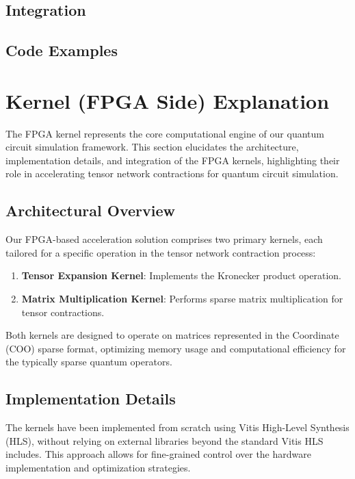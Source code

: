 \documentclass[12pt,oneside,a4paper]{article}
\begin{document}
\subsection{Integration}

\subsection{Code Examples}

\section{Kernel (FPGA Side) Explanation}

The FPGA kernel represents the core computational engine of our quantum circuit simulation framework. This section elucidates the architecture, implementation details, and integration of the FPGA kernels, highlighting their role in accelerating tensor network contractions for quantum circuit simulation.

\subsection{Architectural Overview}

Our FPGA-based acceleration solution comprises two primary kernels, each tailored for a specific operation in the tensor network contraction process:

\begin{enumerate}
    \item \textbf{Tensor Expansion Kernel}: Implements the Kronecker product operation.
    \item \textbf{Matrix Multiplication Kernel}: Performs sparse matrix multiplication for tensor contractions.
\end{enumerate}

Both kernels are designed to operate on matrices represented in the Coordinate (COO) sparse format, optimizing memory usage and computational efficiency for the typically sparse quantum operators.

\subsection{Implementation Details}

The kernels have been implemented from scratch using Vitis High-Level Synthesis (HLS), without relying on external libraries beyond the standard Vitis HLS includes. This approach allows for fine-grained control over the hardware implementation and optimization strategies.
\end{document}

